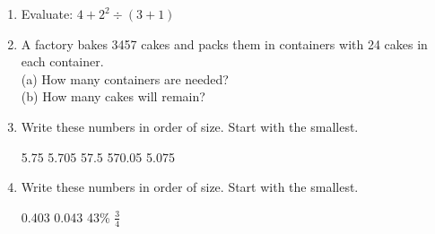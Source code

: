 \documentclass{article}
\begin{document}
\begin{enumerate}
     
 \item \quad Evaluate: \( 4 + 2^{2} \div (3 + 1 ) \) %
\vspace{10pt}
\vspace{5pt}

\item \quad A factory bakes 3457 cakes and packs them in containers with 24 cakes in each container.  \\
\quad (a) How many containers are needed? \\
\quad (b) How many cakes will remain? 
\vspace{10pt}
\vspace{5pt}


\item \quad Write these numbers in order of size. Start with the smallest. %
\begin{center}
5.75 \hspace{2cm} 5.705  \hspace{2cm} 57.5 \hspace{2cm} 570.05 \hspace{2cm} 5.075 
\end{center}


\vspace{10pt}
\vspace{5pt}

\item \quad Write these numbers in order of size. Start with the smallest. %
\begin{center}
0.403 \hspace{2cm} 0.043 \hspace{2cm} 43\% \hspace{2cm}  \( \displaystyle \frac{3}{4} \) 
\end{center}



\end{enumerate}
\end{document}
